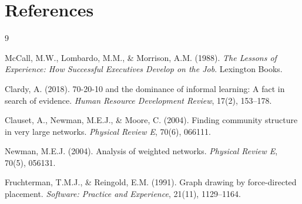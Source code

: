 \documentclass[12pt,a4paper]{article}
\begin{document}
\section*{References}
\begin{thebibliography}{9}

McCall, M.W., Lombardo, M.M., \& Morrison, A.M. (1988).
\textit{The Lessons of Experience: How Successful Executives Develop
on the Job}.
Lexington Books.

Clardy, A. (2018).
70-20-10 and the dominance of informal learning: A fact in search
of evidence.
\textit{Human Resource Development Review}, 17(2), 153--178.

Clauset, A., Newman, M.E.J., \& Moore, C. (2004).
Finding community structure in very large networks.
\textit{Physical Review E}, 70(6), 066111.

Newman, M.E.J. (2004).
Analysis of weighted networks.
\textit{Physical Review E}, 70(5), 056131.

Fruchterman, T.M.J., \& Reingold, E.M. (1991).
Graph drawing by force-directed placement.
\textit{Software: Practice and Experience}, 21(11), 1129--1164.

\end{thebibliography}
\end{document}
